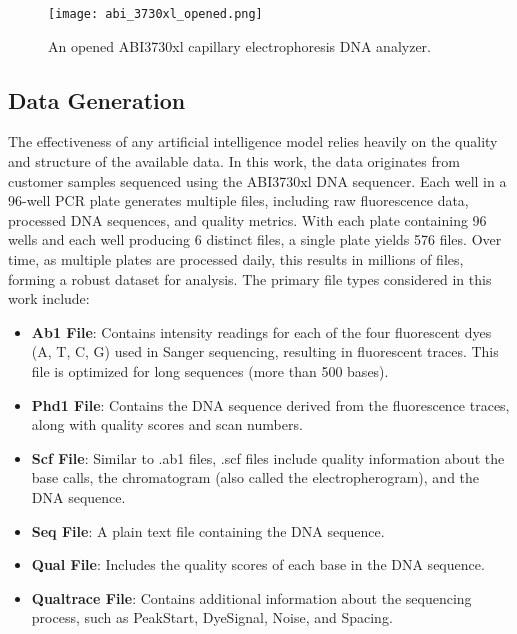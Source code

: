 \begin{figure}[h]
\centering
\texttt{[image: abi\_3730xl\_opened.png]}
\caption{An opened ABI3730xl capillary electrophoresis DNA analyzer.}
\label{fig:abi_3730xl_opened}
\end{figure}

\subsection{Data Generation}

The effectiveness of any artificial intelligence model relies heavily on the quality and structure of the available data. In this work, the data originates from customer samples sequenced using the ABI3730xl DNA sequencer. Each well in a 96-well PCR plate generates multiple files, including raw fluorescence data, processed DNA sequences, and quality metrics. With each plate containing 96 wells and each well producing 6 distinct files, a single plate yields 576 files. Over time, as multiple plates are processed daily, this results in millions of files, forming a robust dataset for analysis.
The primary file types considered in this work include:

\begin{itemize}
  \item \textbf{Ab1 File}: Contains intensity readings for each of the four fluorescent dyes (A, T, C, G) used in Sanger sequencing, resulting in fluorescent traces. This file is optimized for long sequences (more than 500 bases).
  \item \textbf{Phd1 File}: Contains the DNA sequence derived from the fluorescence traces, along with quality scores and scan numbers.
  \item \textbf{Scf File}: Similar to .ab1 files, .scf files include quality information about the base calls, the chromatogram (also called the electropherogram), and the DNA sequence.
  \item \textbf{Seq File}: A plain text file containing the DNA sequence.
  \item \textbf{Qual File}: Includes the quality scores of each base in the DNA sequence.
  \item \textbf{Qualtrace File}: Contains additional information about the sequencing process, such as PeakStart, DyeSignal, Noise, and Spacing.
\end{itemize}

